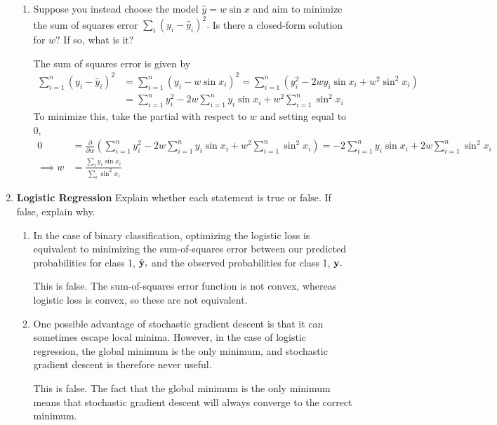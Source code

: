 \documentclass{article}
\begin{document}
\begin{enumerate}[1)]
\begin{enumerate}[1.]
			\item Suppose you instead choose the model $\hat y=w\sin x$ and aim to minimize the sum of squares error $\sum_{i}^{}(y_i-\hat y_i)^2.$ Is there a closed-form solution for $w?$ If so, what is it?
				\begin{soln}
					The sum of squares error is given by
					\begin{align*}
						\sum_{i=1}^{n} (y_i-\hat y_i)^2 &= \sum_{i=1}^{n} (y_i-w\sin x_i)^2 = \sum_{i=1}^{n} (y_i^2-2wy_i\sin x_i+w^2\sin^2x_i) \\
						&= \sum_{i=1}^{n} y_i^2 - 2w\sum_{i=1}^{n} y_i\sin x_i + w^2\sum_{i=1}^{n} \sin^2x_i
					\end{align*}
					To minimize this, take the partial with respect to $w$ and setting equal to 0,
					\begin{align*}
						0 &= \frac{\partial}{\partial w} \left( \sum_{i=1}^{n} y_i^2 - 2w\sum_{i=1}^{n} y_i\sin x_i  + w^2\sum_{i=1}^{n} \sin^2x_i\right) = -2\sum_{i=1}^{n} y_i\sin x_i + 2w\sum_{i=1}^{n} \sin^2 x_i \\
						\implies w &= \frac{\sum_{i}^{}y_i\sin x_i}{\sum_{i}^{}\sin^2x_i}
					\end{align*}
				\end{soln}
				
		\end{enumerate}

		\newpage

	\item \textbf{Logistic Regression} Explain whether each statement is true or false. If false, explain why.
		\begin{enumerate}[1.]
			\item In the case of binary classification, optimizing the logistic loss is equivalent to minimizing the sum-of-squares error between our predicted probabilities for class 1, $\hat{\bf y},$ and the observed probabilities for class 1, $\bf y.$
				\begin{answer*}
					This is false. The sum-of-squares error function is not convex, whereas logistic loss is convex, so these are not equivalent.
				\end{answer*}

			\item One possible advantage of stochastic gradient descent is that it can sometimes escape local minima. However, in the case of logistic regression, the global minimum is the only minimum, and stochastic gradient descent is therefore never useful.
				\begin{answer*}
					This is false. The fact that the global minimum is the only minimum means that stochastic gradient descent will always converge to the correct minimum.
				\end{answer*}
				
		\end{enumerate}
		
\end{enumerate}
\end{document}
